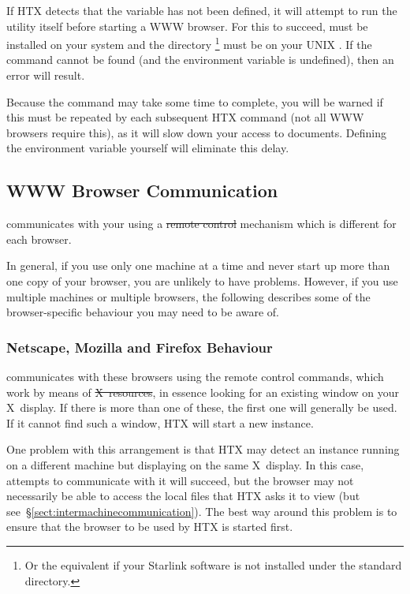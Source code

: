 If HTX detects that the  variable has not been defined, it
will attempt to run the  utility itself before starting a
WWW browser. For this to succeed,  must be installed on
your system and the directory \footnote{Or the
equivalent if your Starlink software is not installed under the
standard  directory.} must be on your UNIX . If the
 command cannot be found (and the 
environment variable is undefined), then an error will result.

Because the  command may take some time to complete, you
will be warned if this must be repeated by each subsequent HTX
command (not all WWW browsers require this), as it will slow down your
access to documents. Defining the  environment variable
yourself will eliminate this delay.

\subsection{\label{sect:browsercommunication}WWW Browser Communication}

 communicates with your  using a \st{remote control} mechanism
which is different for each browser. 

In general, if you use only one machine at a time and never start up
more than one copy of your browser, you are unlikely to have
problems. However, if you use multiple machines or multiple browsers,
the following describes some of the browser-specific behaviour you may
need to be aware of.

\subsubsection{Netscape, Mozilla and Firefox Behaviour}

 communicates with these browsers using
the remote control commands, which work by means of \st{X~resources}, in
essence looking for an existing window on your X~display. If there is more
than one of these, the first one will generally be used. If it cannot find
such a window, HTX will start a new instance.

One problem with this arrangement is that HTX may detect an instance running
on a different machine but displaying on the same X~display. In this case,
attempts to communicate with it will succeed, but the browser may not
necessarily be able to access the local files that HTX asks it to view (but
see~\S\ref{sect:intermachinecommunication}). The best way around this problem
is to ensure that the browser to be used by HTX is started first.

